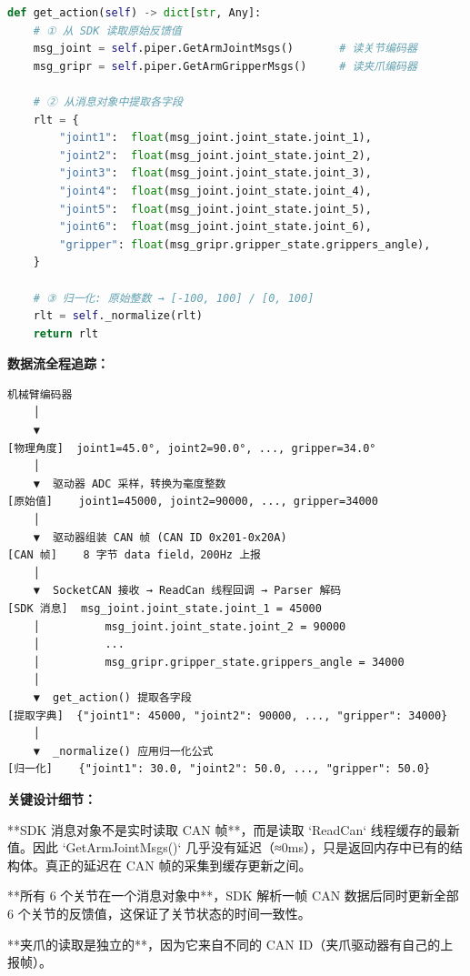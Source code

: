 \documentclass[UTF8,a4paper,11pt]{ctexart}
\begin{document}
\begin{lstlisting}[language=python]
def get_action(self) -> dict[str, Any]:
    # ① 从 SDK 读取原始反馈值
    msg_joint = self.piper.GetArmJointMsgs()       # 读关节编码器
    msg_gripr = self.piper.GetArmGripperMsgs()     # 读夹爪编码器

    # ② 从消息对象中提取各字段
    rlt = {
        "joint1":  float(msg_joint.joint_state.joint_1),
        "joint2":  float(msg_joint.joint_state.joint_2),
        "joint3":  float(msg_joint.joint_state.joint_3),
        "joint4":  float(msg_joint.joint_state.joint_4),
        "joint5":  float(msg_joint.joint_state.joint_5),
        "joint6":  float(msg_joint.joint_state.joint_6),
        "gripper": float(msg_gripr.gripper_state.grippers_angle),
    }

    # ③ 归一化: 原始整数 → [-100, 100] / [0, 100]
    rlt = self._normalize(rlt)
    return rlt
\end{lstlisting}

\textbf{数据流全程追踪：}

\begin{lstlisting}[language=text]
机械臂编码器
    │
    ▼
[物理角度]  joint1=45.0°, joint2=90.0°, ..., gripper=34.0°
    │
    ▼  驱动器 ADC 采样，转换为毫度整数
[原始值]    joint1=45000, joint2=90000, ..., gripper=34000
    │
    ▼  驱动器组装 CAN 帧 (CAN ID 0x201-0x20A)
[CAN 帧]    8 字节 data field，200Hz 上报
    │
    ▼  SocketCAN 接收 → ReadCan 线程回调 → Parser 解码
[SDK 消息]  msg_joint.joint_state.joint_1 = 45000
    │          msg_joint.joint_state.joint_2 = 90000
    │          ...
    │          msg_gripr.gripper_state.grippers_angle = 34000
    │
    ▼  get_action() 提取各字段
[提取字典]  {"joint1": 45000, "joint2": 90000, ..., "gripper": 34000}
    │
    ▼  _normalize() 应用归一化公式
[归一化]    {"joint1": 30.0, "joint2": 50.0, ..., "gripper": 50.0}
\end{lstlisting}

\textbf{关键设计细节：}

\item[1] **SDK 消息对象不是实时读取 CAN 帧**，而是读取 `ReadCan` 线程缓存的最新值。因此 `GetArmJointMsgs()` 几乎没有延迟（≈0ms），只是返回内存中已有的结构体。真正的延迟在 CAN 帧的采集到缓存更新之间。

\item[2] **所有 6 个关节在一个消息对象中**，SDK 解析一帧 CAN 数据后同时更新全部 6 个关节的反馈值，这保证了关节状态的时间一致性。

\item[3] **夹爪的读取是独立的**，因为它来自不同的 CAN ID（夹爪驱动器有自己的上报帧）。
\end{document}
